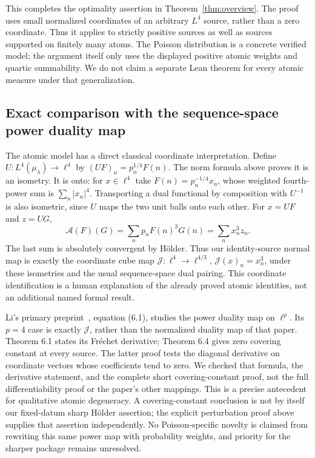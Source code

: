 \documentclass[11pt]{article}
\theoremstyle{remark}\newtheorem{remark}[theorem]{Remark}
\newcommand{\A}{\mathcal A}
\begin{document}
This completes the optimality assertion in Theorem~\ref{thm:overview}.
The proof uses small normalized coordinates of an arbitrary $L^4$
source, rather than a zero coordinate. Thus it applies to strictly
positive sources as well as sources supported on finitely many atoms.
The Poisson distribution is a concrete verified model; the argument
itself only uses the displayed positive atomic weights and quartic
summability. We do not claim a separate Lean theorem for every atomic
measure under that generalization.


\subsection*{Exact comparison with the sequence-space power duality map}
The atomic model has a direct classical coordinate interpretation.
Define $U:L^4(\mu_\lambda)\to\ell^4$ by
$(UF)_n=p_n^{1/4}F(n)$. The norm formula above proves it is an
isometry. It is onto: for $x\in\ell^4$ take
$F(n)=p_n^{-1/4}x_n$, whose weighted fourth-power sum is
$\sum_n|x_n|^4$. Transporting a dual functional by composition with
$U^{-1}$ is also isometric, since $U$ maps the two unit balls onto
each other. For $x=UF$ and $z=UG$,
\[
 \A(F)(G)=\sum_n p_nF(n)^3G(n)=\sum_n x_n^3z_n.
\]
The last sum is absolutely convergent by H\"older. Thus our identity-source
normal map is exactly the coordinate cube map
$\mathcal J:\ell^4\to\ell^{4/3}$, $\mathcal J(x)_n=x_n^3$, under these
isometries and the usual sequence-space dual pairing. This coordinate
identification is a human explanation of the already proved atomic
identities, not an additional named formal result.

Li's primary preprint~\cite{LiDuality}, equation (6.1), studies
the power duality map on $\ell^p$. Its $p=4$ case is exactly
$\mathcal J$, rather than the normalized duality map of that paper.
Theorem 6.1 states its Fr\'echet derivative; Theorem 6.4 gives zero
covering constant at every source. The latter proof tests the diagonal
derivative on coordinate vectors whose coefficients tend to zero.
We checked that formula, the derivative statement, and the complete
short covering-constant proof, not the full differentiability proof or
the paper's other mappings. This is a precise antecedent for
qualitative atomic degeneracy. A covering-constant conclusion is not
by itself our fixed-datum sharp H\"older assertion; the explicit
perturbation proof above supplies that assertion independently.
No Poisson-specific novelty is claimed from rewriting this same power
map with probability weights, and priority for the sharper package
remains unresolved.
\end{document}
